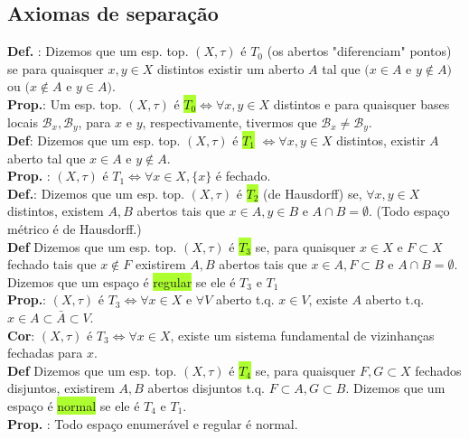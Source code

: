 \documentclass{article}
\begin{document}
\begin{landscape}
\begin{center}
\section{Axiomas de separação}
\end{center}
\begin{multicols}{3}    
\textbf{Def. }: Dizemos que um esp. top. $(X, \tau)$ é $T_0$ (os abertos "diferenciam" pontos) se para quaisquer $x,y\in X$ distintos existir um aberto $A$ tal que $(x \in A$ e $y \notin A)$ ou $(x\notin A$ e $y\in A)$.\\
\textbf{Prop.}: Um esp. top. $(X, \tau)$ é \colorbox{GreenYellow}{$T_0 $}$\iff \forall x,y \in X$ distintos e para quaisquer bases locais $\mathcal{B}_x, \mathcal{B}_y$, para $x$ e $y$, respectivamente, tivermos que $\mathcal{B}_x \neq \mathcal{B}_y$.\\
\textbf{Def}: Dizemos que um esp. top. $(X, \tau)$ é \colorbox{GreenYellow}{$T_1$} $\iff \forall x,y \in X$ distintos, existir $A$ aberto tal que $x \in A$ e $y \notin A$.\\
\textbf{Prop. }: $(X, \tau)$ é $T_1 \iff \forall x \in X, \{x\}$ é fechado.\\
\textbf{Def.}: Dizemos que um esp. top. $(X, \tau)$ é \colorbox{GreenYellow}{$T_2$} (de Hausdorff) se, $\forall x,y \in X$ distintos, existem $A,B$ abertos tais que $x \in A, y\in B$ e $A\cap B = \emptyset$. (Todo espaço métrico é de Hausdorff.)\\
\textbf{Def} Dizemos que um esp. top. $(X, \tau)$ é \colorbox{GreenYellow}{$T_3$} se, para quaisquer $x \in X$ e $F \subset X$ fechado tais que $x \notin F$ existirem $A,B$ abertos tais que $x \in A, F \subset B$ e $A \cap B = \emptyset$. Dizemos que um espaço é \colorbox{GreenYellow}{regular} se ele é $T_3$ e $T_1$\\
\textbf{Prop.}: $(X, \tau)$ é $T_3 \iff \forall x\in X$ e $\forall V$ aberto t.q. $x \in V$, existe $A$ aberto t.q. $x \in A \subset \bar{A} \subset V$.\\
\textbf{Cor}: $(X, \tau)$ é $T_3 \iff \forall x \in X$, existe um sistema fundamental de vizinhanças fechadas para $x$.\\ 
\textbf{Def} Dizemos que um esp. top. $(X, \tau)$ é \colorbox{GreenYellow}{$T_4$} se, para quaisquer $F,G\subset X$ fechados disjuntos, existirem $A,B$ abertos disjuntos t.q. $F\subset A, G \subset B$.
Dizemos que um espaço é \colorbox{GreenYellow}{normal} se ele é $T_4$ e $T_1$.\\
\textbf{Prop. }: Todo espaço enumerável e regular é normal.
\end{multicols}
\begin{center}
    

\end{center}
\end{landscape}
\end{document}
